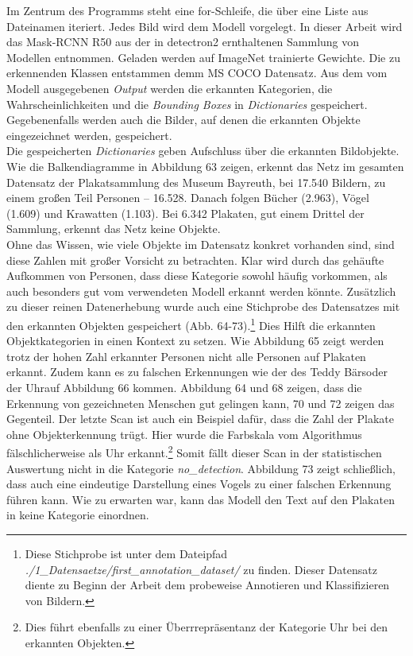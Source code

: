 \documentclass[a4paper,12pt,ngerman]{article}
\begin{document}
Im Zentrum des Programms steht eine for-Schleife, die über eine Liste aus Dateinamen iteriert. Jedes Bild wird dem Modell vorgelegt. In dieser Arbeit wird das Mask-RCNN R50 aus der in detectron2 ernthaltenen Sammlung von Modellen entnommen. Geladen werden auf ImageNet trainierte Gewichte. Die zu erkennenden Klassen entstammen demm MS COCO Datensatz. Aus dem vom Modell ausgegebenen \textit{Output} werden die erkannten Kategorien, die Wahrscheinlichkeiten und die \textit{Bounding Boxes} in \textit{Dictionaries} gespeichert. Gegebenenfalls werden auch die Bilder, auf denen die erkannten Objekte eingezeichnet werden, gespeichert. \\
Die gespeicherten \textit{Dictionaries} geben Aufschluss über die erkannten Bildobjekte. Wie die Balkendiagramme in Abbildung 63 zeigen, erkennt das Netz im gesamten Datensatz der Plakatsammlung des Museum Bayreuth, bei 17.540 Bildern, zu einem großen Teil Personen -- 16.528. Danach folgen Bücher (2.963), Vögel (1.609) und Krawatten (1.103). Bei 6.342 Plakaten, gut einem Drittel der Sammlung, erkennt das Netz keine Objekte. \\
Ohne das Wissen, wie viele Objekte im Datensatz konkret vorhanden sind, sind diese Zahlen mit großer Vorsicht zu betrachten. Klar wird durch das gehäufte Aufkommen von Personen, dass diese Kategorie sowohl häufig vorkommen, als auch besonders gut vom verwendeten Modell erkannt werden könnte. Zusätzlich zu dieser reinen Datenerhebung wurde auch eine Stichprobe des Datensatzes mit den erkannten Objekten gespeichert (Abb. 64-73).\footnote{Diese Stichprobe ist unter dem Dateipfad \textit{./1\_Datensaetze/first\_annotation\_dataset/} zu finden. Dieser Datensatz diente zu Beginn der Arbeit dem probeweise Annotieren und Klassifizieren von Bildern.} Dies Hilft die erkannten Objektkategorien in einen Kontext zu setzen. Wie Abbildung 65 zeigt werden trotz der hohen Zahl erkannter Personen nicht alle Personen auf Plakaten erkannt. Zudem kann es zu falschen Erkennungen wie der des \glqq Teddy Bärs\grqq oder der \glqq Uhr\grqq auf Abbildung 66 kommen. Abbildung 64 und 68 zeigen, dass die Erkennung von gezeichneten Menschen gut gelingen kann, 70 und 72 zeigen das Gegenteil. Der letzte Scan ist auch ein Beispiel dafür, dass die Zahl der Plakate ohne Objekterkennung trügt. Hier wurde die Farbskala vom Algorithmus fälschlicherweise als Uhr erkannt.\footnote{Dies führt ebenfalls zu einer Überrrepräsentanz der Kategorie Uhr bei den erkannten Objekten.} Somit fällt dieser Scan in der statistischen Auswertung nicht in die Kategorie \textit{no\_detection}. Abbildung 73 zeigt schließlich, dass auch eine eindeutige Darstellung eines Vogels zu einer falschen Erkennung führen kann. Wie zu erwarten war, kann das Modell den Text auf den Plakaten in keine Kategorie einordnen. \\
\end{document}
